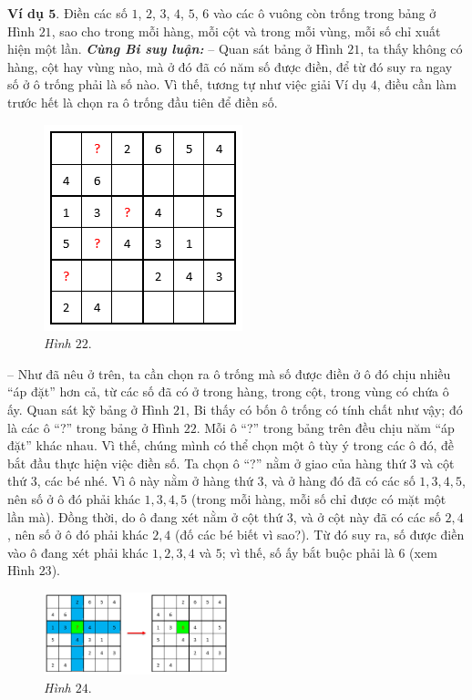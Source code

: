 	\textbf{\color{toancuabi}Ví dụ $\pmb{5.}$} Điền các số $1$, $2$, $3$, $4$, $5$, $6$ vào các ô vuông còn trống trong bảng ở Hình $21$, sao cho trong mỗi hàng, mỗi cột và trong mỗi vùng, mỗi số chỉ xuất hiện một lần.
	\vskip 0.1cm
	\textbf{\color{toancuabi}\textit{Cùng Bi suy luận:}}
	\vskip 0.05cm
	-- Quan sát bảng ở Hình $21$, ta thấy không có hàng, cột hay vùng nào, mà ở đó đã có năm số được điền, để từ đó suy ra ngay số ở ô trống phải là số nào. Vì thế, tương tự như việc giải Ví dụ $4$, điều cần làm trước hết là chọn ra ô trống đầu tiên để điền số.
	\vskip 0.05cm
	\begin{figure}
		\centering
		\vspace*{-15pt}
		\captionsetup{labelformat= empty, justification=centering}
		\includegraphics[scale=0.5]{pic11}
		\vspace*{-5pt}
		\caption{\small\textit{Hình $22.$}}
		\vspace*{-15pt}
	\end{figure}
	-- Như đã nêu ở trên, ta cần chọn ra ô trống mà số được điền ở ô đó chịu nhiều “áp đặt” hơn cả, từ các số đã có ở trong hàng, trong cột, trong vùng có chứa ô ấy. Quan sát kỹ bảng ở Hình $21$, Bi thấy có bốn ô trống có tính chất như vậy; đó là các ô “?” trong bảng ở Hình $22$.
	\vskip 0.1cm
	Mỗi ô “?” trong bảng trên đều chịu năm “áp đặt” khác nhau. Vì thế, chúng mình có thể chọn một ô tùy ý trong các ô đó, đề bắt đầu thực hiện việc điền số. Ta chọn ô “?” nằm ở giao của hàng thứ $3$ và cột thứ $3$, các bé nhé. Vì ô này nằm ở hàng thứ $3$, và ở hàng đó đã có các số $1, 3, 4, 5$, nên số ở ô đó phải khác $1, 3, 4, 5$ (trong mỗi hàng, mỗi số chỉ được có mặt một lần mà). Đồng thời, do ô đang xét nằm ở cột thứ $3$, và ở cột này đã có các số $2, 4$, nên số ở ô đó phải khác $2, 4$ (đố các bé biết vì sao?). Từ đó suy ra, số được điền vào ô đang xét phải khác $1, 2, 3, 4$ và $5$; vì thế, số ấy bắt buộc phải là $6$ (xem Hình $23$).
	\begin{figure}[H]
		\centering
		\vspace*{-10pt}
		\captionsetup{labelformat= empty, justification=centering}
		\includegraphics[width=0.48\textwidth]{pic12}
		\caption{\small\textit{Hình $24.$}}
		\vspace*{-15pt}
	\end{figure}
